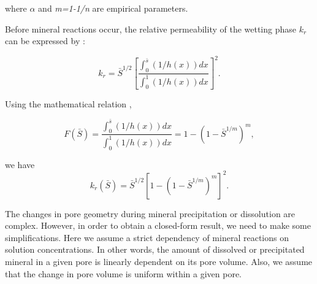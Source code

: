 \documentclass[preprint,12pt,authoryear]{elsarticle}
\begin{document}

where $\alpha$ and \textit{m=1-1/n} are empirical parameters.

Before mineral reactions occur, the relative permeability of the wetting phase \textit{$k_{r}$} can be expressed by \citet{mualem1976new}:

\begin{equation}
\label{eq:Krh_Mua} 
k_r=\bar{S}^{1/2} [\dfrac{\int_0^{\bar{s}} (1/h(x))dx}{\int_0^1 (1/h(x))dx}]^2 .
\end{equation}

Using the mathematical relation \citep{van1980closed},

\begin{equation}
F(\bar{S})=\dfrac{\int_0^{\bar{s}} (1/h(x))dx}{\int_0^1 (1/h(x))dx}=1-(1-\bar{S}^{1/m})^m,
\end{equation}

we have
\begin{equation}
\label{eq:KrS_Mua} 
k_{r}(\bar{S})=\bar{S}^{1/2}[1-(1-\bar{S}^{1/m})^m]^2.
\end{equation}
%
%
%
%
%

The changes in pore geometry during mineral precipitation or dissolution are complex. However, in order to obtain a closed-form result, we need to make some simplifications. Here we assume a strict dependency of mineral reactions on solution concentrations. In other words, the amount of dissolved or precipitated mineral in a given pore is linearly dependent on its pore volume. Also, we assume that the change in pore volume is uniform within a given pore. 
\end{document}
